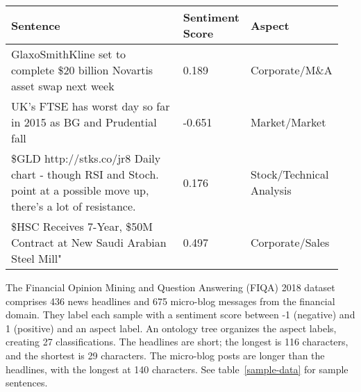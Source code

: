 \renewcommand{\arraystretch}{1.5}
\begin{table*}
    \small
    \caption{Sample FIQA 2018 Data}
    \label{sample-data}
    \centering
    \begin{tabular}{p{0.65\linewidth} | p{0.09\linewidth} | p{0.21\linewidth}}
        \toprule
        Sentence     & Sentiment Score     & Aspect \\
        \midrule
        GlaxoSmithKline set to complete \$20 billion Novartis asset swap next week                                                 & 0.189  & Corporate/M\&A            \\
        UK's FTSE has worst day so far in 2015 as BG and Prudential fall                                                          & -0.651 & Market/Market            \\
        \$GLD http://stks.co/jr8 Daily chart - though RSI and Stoch. point at a possible move up, there's a lot of resistance.     & 0.176  & Stock/Technical Analysis \\
        \$HSC Receives 7-Year, \$50M Contract at New Saudi Arabian Steel Mill"                                                      & 0.497  & Corporate/Sales          \\
        \bottomrule
    \end{tabular}
\end{table*}

The Financial Opinion Mining and Question Answering (FIQA) 2018 dataset~\citep{10.1145/3184558.3192301} comprises 436 news headlines and 675 micro-blog messages from the financial domain.
They label each sample with a sentiment score between -1 (negative) and 1 (positive) and an aspect label.
An ontology tree organizes the aspect labels, creating 27 classifications.
The headlines are short;
the longest is 116 characters, and the shortest is 29 characters.
The micro-blog posts are longer than the headlines, with the longest at 140 characters.
See table~\ref{sample-data} for sample sentences.
